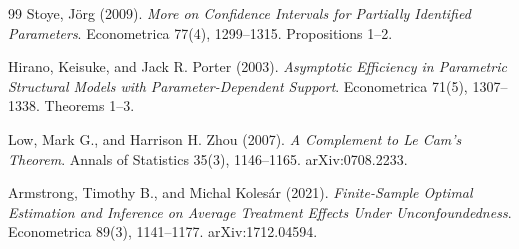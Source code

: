 \documentclass{article}
\begin{document}
\begin{thebibliography}{99}
   Stoye, Jörg (2009). \emph{More on Confidence Intervals for Partially Identified Parameters}. Econometrica 77(4), 1299--1315. Propositions 1--2.

   Hirano, Keisuke, and Jack R. Porter (2003). \emph{Asymptotic Efficiency in Parametric Structural Models with Parameter-Dependent Support}. Econometrica 71(5), 1307--1338. Theorems 1--3.

   Low, Mark G., and Harrison H. Zhou (2007). \emph{A Complement to Le Cam's Theorem}. Annals of Statistics 35(3), 1146--1165. arXiv:0708.2233.

   Armstrong, Timothy B., and Michal Kolesár (2021). \emph{Finite-Sample Optimal Estimation and Inference on Average Treatment Effects Under Unconfoundedness}. Econometrica 89(3), 1141--1177. arXiv:1712.04594.

\end{thebibliography}
\end{document}

